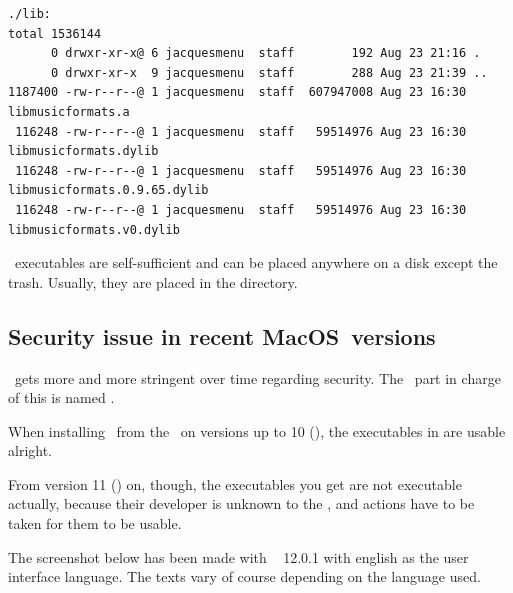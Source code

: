 \begin{lstlisting}[language=Terminal]
./lib:
total 1536144
      0 drwxr-xr-x@ 6 jacquesmenu  staff        192 Aug 23 21:16 .
      0 drwxr-xr-x  9 jacquesmenu  staff        288 Aug 23 21:39 ..
1187400 -rw-r--r--@ 1 jacquesmenu  staff  607947008 Aug 23 16:30 libmusicformats.a
 116248 -rw-r--r--@ 1 jacquesmenu  staff   59514976 Aug 23 16:30 libmusicformats.dylib
 116248 -rw-r--r--@ 1 jacquesmenu  staff   59514976 Aug 23 16:30 libmusicformats.0.9.65.dylib
 116248 -rw-r--r--@ 1 jacquesmenu  staff   59514976 Aug 23 16:30 libmusicformats.v0.dylib
\end{lstlisting}

\MacOS\ executables are self-sufficient and can be placed anywhere on a disk except the trash. Usually, they are placed in the  directory.


\subsection{Security issue in recent MacOS\texttrademark\ versions}

\MacOS\ gets more and more stringent over time regarding security. The \OS\ part in charge of this is named \Gatekeeper.

When installing \mf\ from the \repo\ on versions up to 10 (), the executables in  are usable alright.

From version 11 () on, though, the executables you get are not executable actually, because their developer is unknown to the \OS, and actions have to be taken for them to be usable.

The screenshot below has been made with \MacOS\  12.0.1 with english as the user interface language. The texts vary of course depending on the language used.


